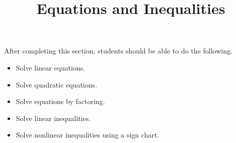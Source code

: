 \documentclass{ximera}
\title{Equations and Inequalities}
\begin{document}
\begin{abstract} 
\end{abstract}

\maketitle

\begin{sectionOutcomes}
After completing this section, students should be able to do the following.

\begin{itemize}
	\item Solve linear equations.
	\item Solve quadratic equations.
	\item Solve equations by factoring.
	\item Solve linear inequalities.
	\item Solve nonlinear inequalities using a sign chart.
\end{itemize}
\end{sectionOutcomes}
\end{document}
